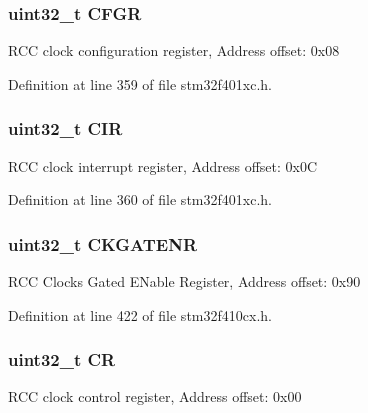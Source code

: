 \subsubsection[{\texorpdfstring{C\+F\+GR}{CFGR}}]{ uint32\+\_\+t C\+F\+GR}\hypertarget{struct_r_c_c___type_def_a26f1e746ccbf9c9f67e7c60e61085ec1}{}\label{struct_r_c_c___type_def_a26f1e746ccbf9c9f67e7c60e61085ec1}
R\+CC clock configuration register, Address offset\+: 0x08 

Definition at line 359 of file stm32f401xc.\+h.

\subsubsection[{\texorpdfstring{C\+IR}{CIR}}]{ uint32\+\_\+t C\+IR}\hypertarget{struct_r_c_c___type_def_a907d8154c80b7e385478943f90b17a3b}{}\label{struct_r_c_c___type_def_a907d8154c80b7e385478943f90b17a3b}
R\+CC clock interrupt register, Address offset\+: 0x0C 

Definition at line 360 of file stm32f401xc.\+h.

\subsubsection[{\texorpdfstring{C\+K\+G\+A\+T\+E\+NR}{CKGATENR}}]{ uint32\+\_\+t C\+K\+G\+A\+T\+E\+NR}\hypertarget{struct_r_c_c___type_def_a968181c52f663e22dd22d2622deb2455}{}\label{struct_r_c_c___type_def_a968181c52f663e22dd22d2622deb2455}
R\+CC Clocks Gated E\+Nable Register, Address offset\+: 0x90 

Definition at line 422 of file stm32f410cx.\+h.

\subsubsection[{\texorpdfstring{CR}{CR}}]{ uint32\+\_\+t CR}\hypertarget{struct_r_c_c___type_def_ab40c89c59391aaa9d9a8ec011dd0907a}{}\label{struct_r_c_c___type_def_ab40c89c59391aaa9d9a8ec011dd0907a}
R\+CC clock control register, Address offset\+: 0x00 

